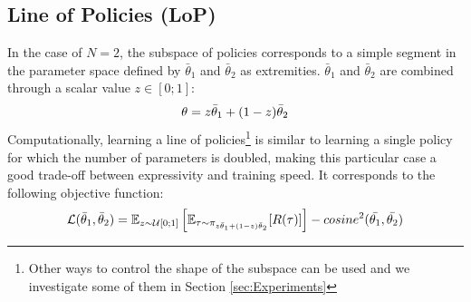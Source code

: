 

\subsection{Line of Policies (LoP)}
\label{LoP}
\vspace{-0.2cm}
In the case of $N=2$, the subspace of policies corresponds to a simple segment in the parameter space defined by $\bar{\theta}_1$ and $\bar{\theta}_2$ as extremities. $\bar{\theta}_1$ and $\bar{\theta}_2$ are combined through a  scalar value $z \in [0;1]$:
\begin{equation}
    \theta = z \bar{\theta}_1 + (1-z) \bar{\theta}_2   \vspace{-0.15cm} 
\end{equation}
Computationally, learning a line of policies\footnote{Other ways to control the shape of the subspace can be used and we investigate some of them in Section \ref{sec:Experiments}} is similar to learning a single policy for which the number of parameters is doubled, making this particular case a good trade-off between expressivity and training speed. It corresponds to the following objective function:
\begin{equation}
    \mathcal{L}(\bar{\theta}_1,\bar{\theta}_2) =  \mathbb{E}_{z \sim \mathcal{U}[0;1]} \left[ \mathbb{E}_{\tau \sim \pi_{z \bar{\theta}_1 + (1-z) \bar{\theta}_2 }}[R(\tau)] \right]  -   cosine^2(\bar{\theta_1},\bar{\theta_2})  \vspace{-0.15cm} 
\end{equation}

